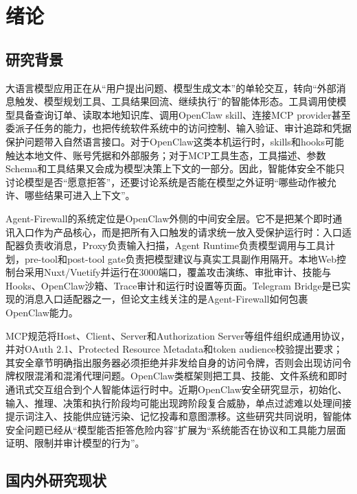 \documentclass[UTF8,zihao=-4,scheme=chinese,fontset=none]{ctexart}
\begin{document}
\clearpage
{}
\setcounter{page}{1}

\section{绪论}

\subsection{研究背景}

大语言模型应用正在从“用户提出问题、模型生成文本”的单轮交互，转向“外部消息触发、模型规划工具、工具结果回流、继续执行”的智能体形态。工具调用使模型具备查询订单、读取本地知识库、调用OpenClaw skill、连接MCP provider甚至委派子任务的能力，也把传统软件系统中的访问控制、输入验证、审计追踪和凭据保护问题带入自然语言接口。对于OpenClaw这类本机运行时，skills和hooks可能触达本地文件、账号凭据和外部服务；对于MCP工具生态，工具描述、参数Schema和工具结果又会成为模型决策上下文的一部分。因此，智能体安全不能只讨论模型是否“愿意拒答”，还要讨论系统是否能在模型之外证明“哪些动作被允许、哪些结果可进入上下文”。

Agent-Firewall的系统定位是OpenClaw外侧的中间安全层。它不是把某个即时通讯入口作为产品核心，而是把所有入口触发的请求统一放入受保护运行时：入口适配器负责收消息，Proxy负责输入扫描，Agent Runtime负责模型调用与工具计划，pre-tool和post-tool gate负责把模型建议与真实工具副作用隔开。本地Web控制台采用Nuxt/Vuetify并运行在3000端口，覆盖攻击演练、审批审计、技能与Hooks、OpenClaw沙箱、Trace审计和运行时设置等页面。Telegram Bridge是已实现的消息入口适配器之一，但论文主线关注的是Agent-Firewall如何包裹OpenClaw能力。

MCP规范将Host、Client、Server和Authorization Server等组件组织成通用协议，并对OAuth 2.1、Protected Resource Metadata和token audience校验提出要求；其安全章节明确指出服务器必须拒绝并非发给自身的访问令牌，否则会出现访问令牌权限混淆和混淆代理问题\cite{anthropic_mcp,mcp_auth}。OpenClaw类框架则把工具、技能、文件系统和即时通讯式交互组合到个人智能体运行时中。近期OpenClaw安全研究显示，初始化、输入、推理、决策和执行阶段均可能出现跨阶段复合威胁，单点过滤难以处理间接提示词注入、技能供应链污染、记忆投毒和意图漂移\cite{deng2026taming}。这些研究共同说明，智能体安全问题已经从“模型能否拒答危险内容”扩展为“系统能否在协议和工具能力层面证明、限制并审计模型的行为”。

\subsection{国内外研究现状}
\end{document}
